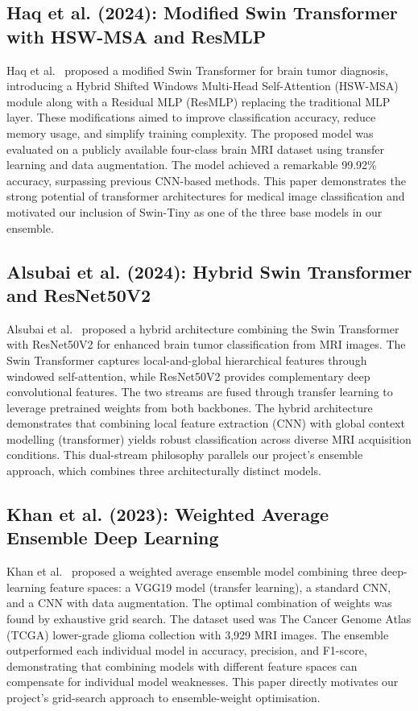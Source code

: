 \documentclass[12pt,a4paper,oneside]{report}
\begin{document}
\subsection{Haq et al. (2024): Modified Swin Transformer with HSW-MSA and ResMLP}

Haq et al.~\cite{haq2024swin} proposed a modified Swin Transformer for brain tumor diagnosis, introducing a Hybrid Shifted Windows Multi-Head Self-Attention (HSW-MSA) module along with a Residual MLP (ResMLP) replacing the traditional MLP layer. These modifications aimed to improve classification accuracy, reduce memory usage, and simplify training complexity. The proposed model was evaluated on a publicly available four-class brain MRI dataset using transfer learning and data augmentation. The model achieved a remarkable 99.92\% accuracy, surpassing previous CNN-based methods. This paper demonstrates the strong potential of transformer architectures for medical image classification and motivated our inclusion of Swin-Tiny as one of the three base models in our ensemble.

\subsection{Alsubai et al. (2024): Hybrid Swin Transformer and ResNet50V2}

Alsubai et al.~\cite{alsubai2024swin} proposed a hybrid architecture combining the Swin Transformer with ResNet50V2 for enhanced brain tumor classification from MRI images. The Swin Transformer captures local-and-global hierarchical features through windowed self-attention, while ResNet50V2 provides complementary deep convolutional features. The two streams are fused through transfer learning to leverage pretrained weights from both backbones. The hybrid architecture demonstrates that combining local feature extraction (CNN) with global context modelling (transformer) yields robust classification across diverse MRI acquisition conditions. This dual-stream philosophy parallels our project's ensemble approach, which combines three architecturally distinct models.

\subsection{Khan et al. (2023): Weighted Average Ensemble Deep Learning}

Khan et al.~\cite{khan2023ensemble} proposed a weighted average ensemble model combining three deep-learning feature spaces: a VGG19 model (transfer learning), a standard CNN, and a CNN with data augmentation. The optimal combination of weights was found by exhaustive grid search. The dataset used was The Cancer Genome Atlas (TCGA) lower-grade glioma collection with 3,929 MRI images. The ensemble outperformed each individual model in accuracy, precision, and F1-score, demonstrating that combining models with different feature spaces can compensate for individual model weaknesses. This paper directly motivates our project's grid-search approach to ensemble-weight optimisation.
\end{document}
